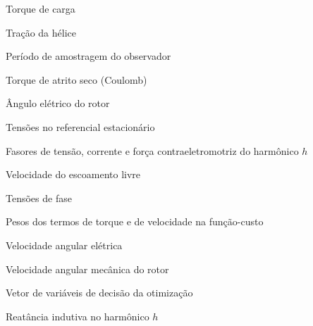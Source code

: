 \begin{simbolos}
	\item[$T_L$] Torque de carga
	\item[$T_{prop}$] Tração da hélice
	\item[$T_s$] Período de amostragem do observador
	\item[$\tau_c$] Torque de atrito seco (Coulomb)
	\item[$\theta_e$] Ângulo elétrico do rotor
	\item[$v_\alpha, v_\beta$] Tensões no referencial estacionário
	\item[$\dot{V}_h, \dot{I}_h, \dot{E}_h$] Fasores de tensão, corrente e força contraeletromotriz do harmônico $h$
	\item[$V_\infty$] Velocidade do escoamento livre
	\item[$v_k, v_a, v_b, v_c$] Tensões de fase
	\item[$w_T, w_\omega$] Pesos dos termos de torque e de velocidade na função-custo
	\item[$\omega_e$] Velocidade angular elétrica
	\item[$\omega_m$] Velocidade angular mecânica do rotor
	\item[$\mathbf{x}$] Vetor de variáveis de decisão da otimização
	\item[$X_{L,h}$] Reatância indutiva no harmônico $h$
\end{simbolos}
